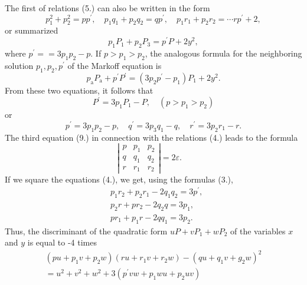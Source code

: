 \documentclass[12pt]{article}
\begin{document}
The first of relations (5.) can also be written in the form
\begin{equation*}    
p_{1}^{2}+p_{2}^{2}=p p^{\prime}, \quad p_{1} q_{1}+p_{2} q_{2}=q p^{\prime} , \quad p_{1} r_{1}+p_{2} r_{2}=\cdots r p^{\prime}+2,  \tag{9}
\end{equation*}
or summarized
\begin{equation*}
p_{1} P_{1}+p_{2} P_{3}=p^{\prime} P+2 y^{2}, \tag{10}
\end{equation*}
where $p^{\prime}==3 p_{1} p_{2}-p$. If $p>p_{1}>p_{2}$, the analogous formula for the neighboring solution $p_{1}, p_{2}, p^{\prime}$ of the Markoff equation is
\begin{equation*}
p_{\mathrm{a}} P_{\mathrm{a}}+p^{\prime} P^{\prime}=\left(3 p_{2} p^{\prime}-p_{1}\right) P_{1}+2 y^{2} . 
\end{equation*}
From these two equations, it follows that
\begin{equation*}
P^{\prime}=3 p_{1} P_{1}-P,  \quad \left(p>p_{1}>p_{2}\right) \tag{11}
\end{equation*}
or
\begin{equation*}
p^{\prime}=3 p_{1} p_{2}-p, \quad q^{\prime}=3 p_{3} q_{1}-q, \quad r^{\prime}=3 p_{2} r_{1}-r. \tag{12.}
\end{equation*}
The third equation (9.) in connection with the relations (4.) leads to the formula
\begin{equation*}
\left|\begin{array}{lll}
p & p_{1} & p_{2}  \\
q & q_{1} & q_{2} \\
r & r_{1} & r_{2}
\end{array}\right|=2 \varepsilon.  \quad \tag{13.}
\end{equation*}
If we square the equations (4.), we get, using the formulas (3.),
\begin{align*}
& p_{1} r_{2}+p_{2} r_{1}-2 q_{1} q_{2}=3 p^{\prime}, \\
& p_{2} r+p r_{2}-2 q_{2} q=3 p_{1},  \tag{14.}\\
& p r_{1}+p_{1} r-2 q q_{1}=3 p_{2}.
\end{align*}
Thus, the discriminant of the quadratic form 
$u P+v P_{1}+w P_{2}$ of the variables $x$ and $y$ is equal to -4 times
\begin{gather*}
\left(p u+p_{1} v+p_{2} w\right)\left(r u+r_{1} v+r_{2} w\right)-\left(q u+q_{1} v+g_{2} w\right)^{2}  \tag{15.}\\
=u^{2}+v^{2}+w^{2}+3\left(p^{\prime} v w+p_{1} w u+p_{2} u v\right)
\end{gather*}
\end{document}
